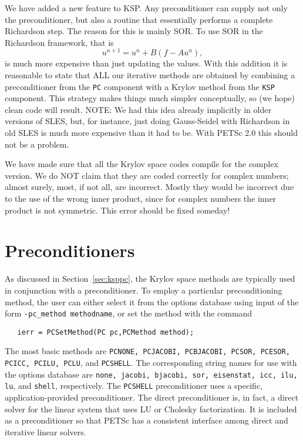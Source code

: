 \begin{design}
We have added a new feature to KSP. Any preconditioner can supply not 
only the preconditioner, but also a routine that essentially performs a
complete Richardson step. The reason for this is mainly SOR. To 
use SOR in the Richardson framework, that is 
\[
  u^{n+1} = u^{n} + B(f - A u^{n}), 
\]
is much more expensive than just updating the values.
With this addition it is reasonable to state that ALL our
iterative methods are obtained by combining a preconditioner from 
the {\tt PC} component with a Krylov method from the {\tt KSP}
component. This strategy makes things much simpler conceptually, so 
(we hope)
clean code will result. NOTE: We had this idea already implicitly in 
older versions of SLES, but, for instance, just doing Gauss-Seidel
with Richardson in old SLES is much more expensive than it had to be. 
With PETSc 2.0 this should not be a problem. 
\end{design}

We have made sure that all the Krylov space codes compile for the 
complex version. We do NOT claim that they are coded correctly 
for complex numbers; almost surely, most, if not all, are incorrect. 
Mostly they would be incorrect due to the use of the wrong inner 
product, since for complex numbers the inner product is not 
symmetric. This error should be fixed someday!

\section{Preconditioners} 
\label{sec:pc}

As discussed in Section~\ref{sec:ksppc}, the Krylov space methods are
typically used in conjunction with a preconditioner.
To employ a particular preconditioning method, the user can either select 
it from the options database using input of the form 
{\tt -pc\_method methodname}, or set the method with the 
command  
\begin{verbatim}
   ierr = PCSetMethod(PC pc,PCMethod method);
\end{verbatim}
The most basic methods are {\tt PCNONE, PCJACOBI, PCBJACOBI,
PCSOR, PCESOR, PCICC, PCILU, 
PCLU}, and {\tt PCSHELL}.   
    
The  corresponding string names for use with the options 
database are {\tt none, jacobi, bjacobi, sor, eisenstat, icc, ilu, lu}, 
and {\tt shell}, respectively. The {\tt PCSHELL} preconditioner uses a 
specific, application-provided preconditioner. 
The direct preconditioner is, in fact, a direct solver for the linear system 
that uses LU or Cholesky factorization. It is included as a preconditioner 
so that PETSc has a consistent interface among direct and iterative 
linear solvers.

